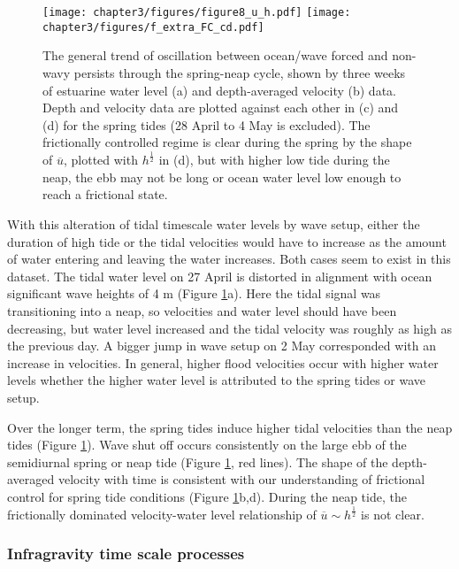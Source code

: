 \begin{figure}
\centering
\texttt{[image: chapter3/figures/figure8\_u\_h.pdf]}
\texttt{[image: chapter3/figures/f\_extra\_FC\_cd.pdf]}

\protect\caption{The general trend of oscillation between ocean/wave forced and non-wavy
persists through the spring-neap cycle, shown by three weeks of estuarine
water level (a) and depth-averaged velocity (b) data. Depth and velocity
data are plotted against each other in (c) and (d) for the spring
tides (28 April to 4 May is excluded). The frictionally controlled
regime is clear during the spring by the shape of $\overline{u}$,
plotted with $h^{\frac{1}{2}}$ in (d), but with higher low tide during
the neap, the ebb may not be long or ocean water level low enough
to reach a frictional state. \label{f8_ltHU}}
\end{figure}


With this alteration of tidal timescale water levels by wave setup,
either the duration of high tide or the tidal velocities would have
to increase as the amount of water entering and leaving the water
increases. Both cases seem to exist in this dataset. The tidal
water level on 27 April is distorted in alignment with ocean significant
wave heights of 4 m (Figure \ref{f8_ltHU}a). Here the tidal signal
was transitioning into a neap, so velocities and water level should
have been decreasing, but water level increased and the tidal velocity
was roughly as high as the previous day. A bigger jump in wave setup
on 2 May corresponded with an increase in velocities. In general,
higher flood velocities occur with higher water levels whether the
higher water level is attributed to the spring tides or wave setup. 

Over the longer term, the spring tides induce higher tidal velocities
than the neap tides (Figure \ref{f8_ltHU}). Wave shut off occurs
consistently on the large ebb of the semidiurnal spring or neap tide
(Figure \ref{f8_ltHU}, red lines). The shape of the depth-averaged
velocity with time is consistent with our understanding of frictional
control for spring tide conditions (Figure \ref{f8_ltHU}b,d). During
the neap tide, the frictionally dominated velocity-water level relationship
of $\overline{u}\sim h^{\frac{1}{2}}$ is not clear. 


\subsubsection{Infragravity time scale processes}

